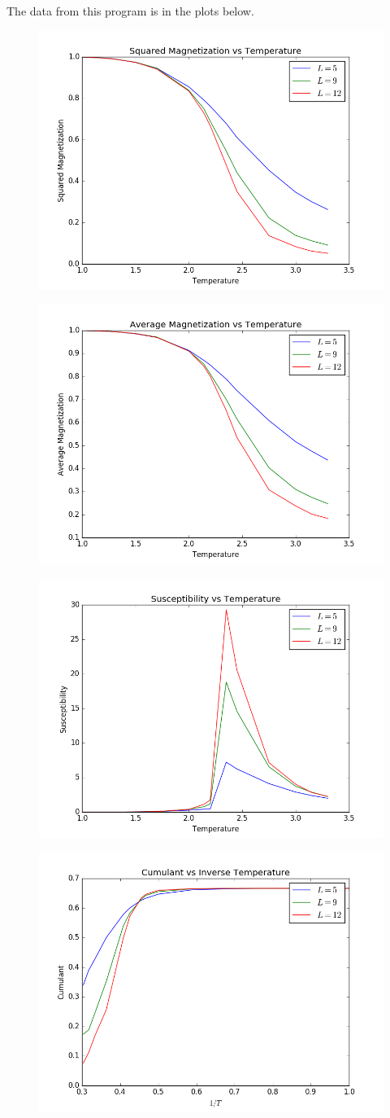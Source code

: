 \documentclass[10pt,letter]{article}
\begin{document}
The data from this program is in the plots below.
\begin{figure}[H]
  \centering
    \includegraphics[width=.6\textwidth]{homework9_problem1_plot1}
\end{figure}
\begin{figure}[H]
  \centering
    \includegraphics[width=.6\textwidth]{homework9_problem1_plot2}
\end{figure}
\begin{figure}[H]
  \centering
    \includegraphics[width=.6\textwidth]{homework9_problem1_plot3}
\end{figure}
\begin{figure}[H]
  \centering
    \includegraphics[width=.6\textwidth]{homework9_problem1_plot4}
\end{figure}
\end{document}
